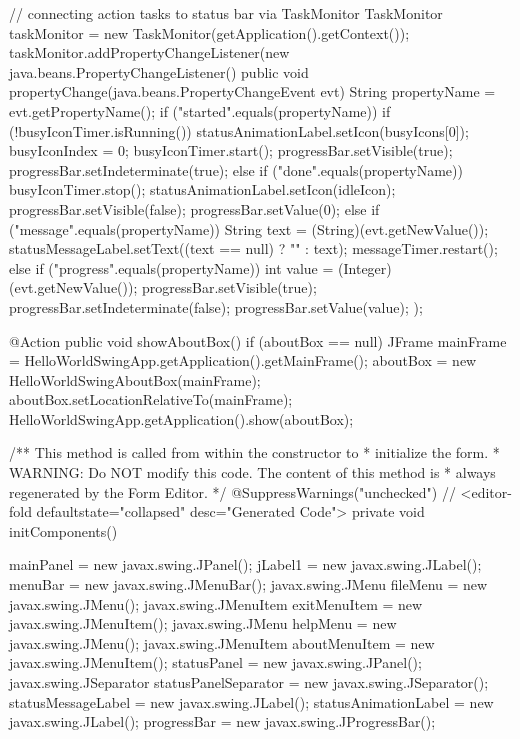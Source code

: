{{        // connecting action tasks to status bar via TaskMonitor
        TaskMonitor taskMonitor = new TaskMonitor(getApplication().getContext());
        taskMonitor.addPropertyChangeListener(new java.beans.PropertyChangeListener() {
            public void propertyChange(java.beans.PropertyChangeEvent evt) {
                String propertyName = evt.getPropertyName();
                if ("started".equals(propertyName)) {
                    if (!busyIconTimer.isRunning()) {
                        statusAnimationLabel.setIcon(busyIcons[0]);
                        busyIconIndex = 0;
                        busyIconTimer.start();
                    }
                    progressBar.setVisible(true);
                    progressBar.setIndeterminate(true);
                } else if ("done".equals(propertyName)) {
                    busyIconTimer.stop();
                    statusAnimationLabel.setIcon(idleIcon);
                    progressBar.setVisible(false);
                    progressBar.setValue(0);
                } else if ("message".equals(propertyName)) {
                    String text = (String)(evt.getNewValue());
                    statusMessageLabel.setText((text == null) ? "" : text);
                    messageTimer.restart();
                } else if ("progress".equals(propertyName)) {
                    int value = (Integer)(evt.getNewValue());
                    progressBar.setVisible(true);
                    progressBar.setIndeterminate(false);
                    progressBar.setValue(value);
                }
            }
        });
    }

    @Action
    public void showAboutBox() {
        if (aboutBox == null) {
            JFrame mainFrame = HelloWorldSwingApp.getApplication().getMainFrame();
            aboutBox = new HelloWorldSwingAboutBox(mainFrame);
            aboutBox.setLocationRelativeTo(mainFrame);
        }
        HelloWorldSwingApp.getApplication().show(aboutBox);
    }

    /** This method is called from within the constructor to
     * initialize the form.
     * WARNING: Do NOT modify this code. The content of this method is
     * always regenerated by the Form Editor.
     */
    @SuppressWarnings("unchecked")
    // <editor-fold defaultstate="collapsed" desc="Generated Code">
    private void initComponents() {

        mainPanel = new javax.swing.JPanel();
        jLabel1 = new javax.swing.JLabel();
        menuBar = new javax.swing.JMenuBar();
        javax.swing.JMenu fileMenu = new javax.swing.JMenu();
        javax.swing.JMenuItem exitMenuItem = new javax.swing.JMenuItem();
        javax.swing.JMenu helpMenu = new javax.swing.JMenu();
        javax.swing.JMenuItem aboutMenuItem = new javax.swing.JMenuItem();
        statusPanel = new javax.swing.JPanel();
        javax.swing.JSeparator statusPanelSeparator = new javax.swing.JSeparator();
        statusMessageLabel = new javax.swing.JLabel();
        statusAnimationLabel = new javax.swing.JLabel();
        progressBar = new javax.swing.JProgressBar();

}}
